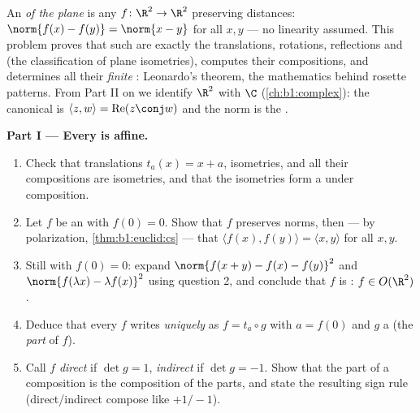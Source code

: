 \begin{problem}\label{pb:b1:euclid:1}
An \emph{ of the plane} is any  $f \colon \R^2 \to
\R^2$ preserving distances: $\norm{f(x) - f(y)} = \norm{x - y}$
for all $x, y$ --- no linearity assumed. This problem proves
that such  are exactly the translations, rotations,
reflections and  (the classification of plane
isometries), computes their compositions, and determines all
their \emph{finite} : Leonardo's theorem, the mathematics
behind rosette patterns. From Part II on we identify $\R^2$ with
$\C$ (\cref{ch:b1:complex}): the canonical  is
$\langle z, w\rangle = \operatorname{Re}(z\conj w)$ and the norm
is the .

\medskip
\noindent\textbf{Part I --- Every  is affine.}
\begin{enumerate}
  \item Check that translations $t_a(x) = x + a$, 
        isometries, and all their compositions are isometries,
        and that the isometries form a  under composition.
  \item Let $f$ be an  with $f(0) = 0$. Show that $f$
        preserves norms, then --- by polarization,
        \cref{thm:b1:euclid:cs} --- that $\langle f(x),
        f(y)\rangle = \langle x, y\rangle$ for all $x, y$.
  \item Still with $f(0) = 0$: expand $\norm{f(x + y) - f(x) -
        f(y)}^2$ and $\norm{f(\lambda x) - \lambda f(x)}^2$
        using question 2, and conclude that $f$ is
        \emph{}: $f \in O(\R^2)$.
  \item Deduce that every  $f$ writes \emph{uniquely} as
        $f = t_a \circ g$ with $a = f(0)$ and $g$ a 
         (the \emph{ part} of $f$).
  \item Call $f$ \emph{direct} if $\det g = 1$, \emph{indirect}
        if $\det g = -1$. Show that the  part of a
        composition is the composition of the  parts, and
        state the resulting sign rule
        (direct/indirect compose like $+1/-1$).
\end{enumerate}


\end{problem}
